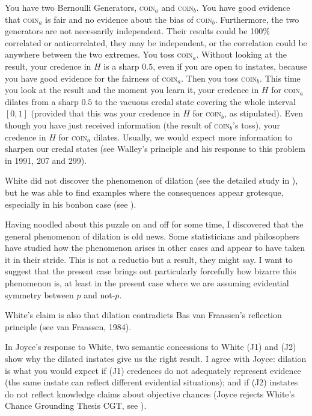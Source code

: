 \documentclass[11pt]{article}
\begin{document}
You have two Bernoulli Generators, \textsc{coin}$_{a}$ and
\textsc{coin}$_{b}$. You have good evidence that \textsc{coin}$_{a}$
is fair and no evidence about the bias of \textsc{coin}$_{b}$.
Furthermore, the two generators are not necessarily independent. Their
results could be 100\% correlated or anticorrelated, they may be
independent, or the correlation could be anywhere between the two
extremes. You toss \textsc{coin}$_{a}$. Without looking at the result,
your credence in $H$ is a sharp $0.5$, even if you are open to
instates, because you have good evidence for the fairness of
\textsc{coin}$_{a}$. Then you toss \textsc{coin}$_{b}$. This time you
look at the result and the moment you learn it, your credence in $H$
for \textsc{coin}$_{a}$ dilates from a sharp $0.5$ to the vacuous
credal state covering the whole interval $[0,1]$ (provided that this
was your credence in $H$ for \textsc{coin}$_{b}$, as stipulated). Even
though you have just received information (the result of
\textsc{coin}$_{b}$'s toss), your credence in $H$ for
\textsc{coin}$_{a}$ dilates. Usually, we would expect more information
to sharpen our credal states (see Walley's  principle and his response to this problem in
1991, 207 and 299).

White did not discover the phenomenon of dilation (see the detailed
study in ), but he was able to find
examples where the consequences appear grotesque, especially in his
bonbon case (see ).

\begin{quotex}
  Having noodled about this puzzle on and off for some time, I
  discovered that the general phenomenon of dilation is old news. Some
  statisticians and philosophers have studied how the phenomenon
  arises in other cases and appear to have taken it in their stride.
  This is not a reductio but a result, they might say. I want to
  suggest that the present case brings out particularly forcefully how
  bizarre this phenomenon is, at least in the present case where we
  are assuming evidential symmetry between $p$ and not-$p$.
\end{quotex}

White's claim is also that dilation contradicts Bas van Fraassen's
reflection principle (see van Fraassen,
1984).

In Joyce's response to White, two semantic concessions to White (J1)
and (J2) show why the dilated instates give us the right result. I
agree with Joyce: dilation is what you would expect if (J1) credences
do not adequately represent evidence (the same instate can reflect
different evidential situations); and if (J2) instates do not reflect
knowledge claims about objective chances (Joyce rejects White's Chance
Grounding Thesis CGT, see ).
\end{document}
